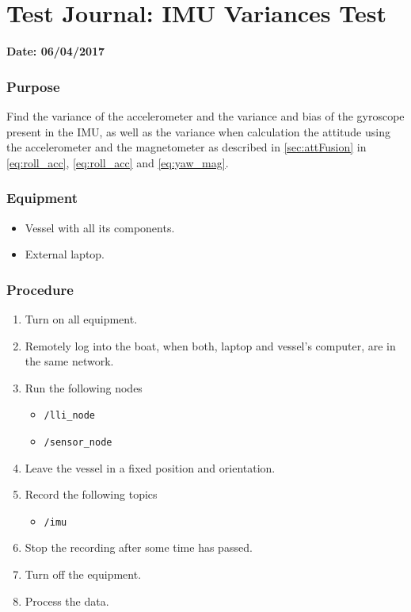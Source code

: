 \chapter{Test Journal: IMU Variances Test} \label{app:IMUVariances}

\textbf{Date: 06/04/2017}

\subsection*{Purpose}
Find the variance of the accelerometer and the variance and bias of the gyroscope present in the IMU, as well as the variance when calculation the attitude using the accelerometer and the magnetometer as described in \autoref{sec:attFusion} in \autoref{eq:roll_acc}, \ref{eq:roll_acc} and \ref{eq:yaw_mag}.

\subsection*{Equipment}
\begin{itemize}
    \item Vessel with all its components.
    \item External laptop.
\end{itemize}

\subsection*{Procedure}
\begin{enumerate}
    \item Turn on all equipment.
    \item Remotely log into the boat, when both, laptop and vessel's computer, are in the same network.
    \item Run the following nodes
    \begin{itemize}
        \item \lstinline[style=cinline]{/lli_node}
        \item \lstinline[style=cinline]{/sensor_node}
    \end{itemize}
    \item Leave the vessel in a fixed position and orientation.
    \item Record the following topics
    \begin{itemize}
        \item \lstinline[style=cinline]{/imu}      
    \end{itemize}
    \item Stop the recording after some time has passed.
    \item Turn off the equipment.
    \item Process the data.
\end{enumerate}

